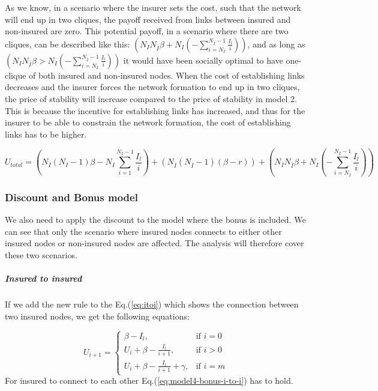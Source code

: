 As we know, in a scenario where the insurer sets the cost, such that the network will end up in two cliques, the payoff received from links between insured and non-insured are zero. This potential payoff, in a scenario where there are two cliques, can be described like this: $(N_{I}N_{\overline{I}}\beta+N_{I}(-\sum_{i=N_{I}}^{N_{\overline{I}}-1}\frac{I_{l}}{i}))$, and as long as $(N_{I}N_{\overline{I}}\beta>N_{I}(-\sum_{i=N_{I}}^{N_{\overline{I}}-1}\frac{I_{l}}{i}))$ it would have been socially optimal to have one-clique of both insured and non-insured nodes.
When the cost of establishing links decreases and the insurer forces the network formation to end up in two cliques, the price of stability will increase compared to the price of stability in model 2. 
This is because the incentive for establishing links has increased, and thus for the insurer to be able to constrain the network formation, the cost of establishing links has to be higher.

\begin{equation}
U_{total}=(N_{I}(N_{I}-1)\beta-N_{I} \sum_{i=1}^{N_{I}-1} \frac{I_{l}}{i})+(N_{\overline{I}}(N_{\overline{I}}-1)(\beta-r))+(N_{I}N_{\overline{I}}\beta+N_{I}(-\sum_{i=N_{I}}^{N_{\overline{I}}-1}\frac{I_{l}}{i}))
\label{eq:model4-discount-total-payoff}
\end{equation}

\subsubsection{Discount and Bonus model}
We also need to apply the discount to the model where the bonus is included. We can see that only the scenario where insured nodes connects to either other insured nodes or non-insured nodes are affected. The analysis will therefore cover these two scenarios.

\subparagraph{Insured to insured}
If we add the new rule to the Eq.(\ref{eq:itoi}) which shows the connection between two insured nodes, we get the following equations: 

\begin{equation}
    U_{i+1}= 
\begin{cases}
    \beta - I_{l},& \text{if } i = 0\\
    U_{i}+\beta -\frac{I_{l}}{i+1},& \text{if }  i>0\\
    U_{i}+\beta -\frac{I_{l}}{i+1}+\gamma,& \text{if } i=m
\end{cases}
\label{eq:discount1}
\end{equation}
For insured to connect to each other Eq.(\ref{eq:model4-bonus-i-to-i}) has to hold.

